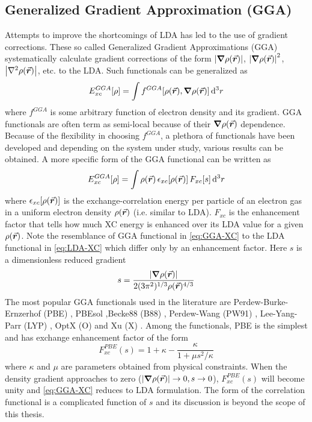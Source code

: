 \subsection{Generalized Gradient Approximation (GGA)}
Attempts to improve the shortcomings of LDA has led to the  use of gradient corrections. These so called Generalized Gradient Approximations (GGA) systematically calculate gradient corrections of the form $\abs{\grad \rho({\va*{r}})}$, $\abs{\grad \rho({\va*{r}})}^2$, $\abs{\laplacian\rho({\va*{r}})}$, etc. to the LDA. Such functionals can be generalized as
\begin{equation}
	E^{GGA}_{xc} [\rho]= \int f^{GGA}[\rho({\va*{r}}),\grad \rho({\va*{r}})] \dd[3]{r}
\end{equation}
where $f^{GGA}$ is some arbitrary function of electron  density and its gradient. GGA functionals are often term as semi-local because of their $\grad \rho({\va*{r}})$ dependence. Because of the flexibility in choosing $f^{GGA}$, a plethora of functionals have been developed and depending on the system under study, various results can be obtained. A more specific form of the GGA functional can be written as \citep{Csonka2009}
\begin{equation} \label{eq:GGA-XC}
	E^{GGA}_{xc} [\rho]= \int \rho({\va*{r}})\, \epsilon_{xc}[\rho({\va*{r}})]\, F_{xc}[s]  \dd[3]{r}
\end{equation}
where $\epsilon_{xc}[\rho({\va*{r}})]$ is the exchange-correlation energy per particle of an electron gas in a uniform electron density $\rho({\va*{r}})$ (i.e. similar to LDA). $F_{xc}$ is the enhancement factor that tells how much XC energy is enhanced over its LDA value for a given  $\rho({\va*{r}})$. Note the resemblance of GGA functional in \eqref{eq:GGA-XC} to the LDA functional in \eqref{eq:LDA-XC} which differ only by an enhancement factor. Here $s$ is a dimensionless reduced gradient
\begin{equation}
	s = \frac{\abs{\grad \rho({\va*{r}})}}{2 (3\pi^2)^{1/3} \rho({\va*{r}})^{4/3}}
\end{equation}
The most popular GGA functionals used in the literature are Perdew-Burke-Ernzerhof (PBE) \citep{Perdew1996}, PBEsol \citep{Perdew2008},Becke88 (B88) \citep{Becke1988},  Perdew-Wang (PW91) \citep{Perdew1992}, Lee-Yang-Parr (LYP) \citep{Lee1988}, OptX (O) \citep{Handy2001} and Xu (X) \citep{Xu2004}. Among the functionals, PBE is the  simplest and has  exchange enhancement factor of the form
\begin{equation}
	F_{xc}^{PBE}(s) = 1 + \kappa  - \frac{\kappa}{1+\mu s^2/\kappa}
\end{equation}
where $\kappa$ and $\mu$ are parameters obtained from physical constraints. When the density gradient approaches to zero ($\abs{\grad \rho({\va*{r}})} \rightarrow 0,s \rightarrow 0$), $F_{xc}^{PBE}(s)$ will become unity and \eqref{eq:GGA-XC} reduces to LDA formulation. The form of the  correlation functional is a complicated function of $s$ and its discussion is beyond the scope of this thesis.

